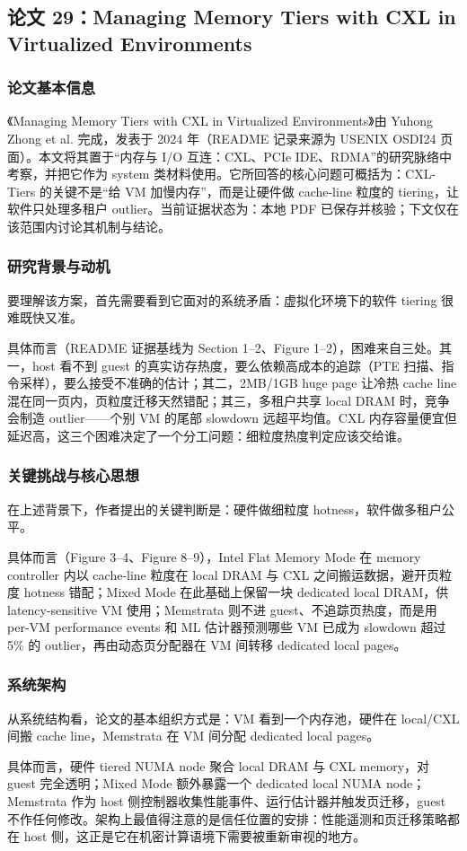 \documentclass[11pt]{ctexart}
\begin{document}
\subsection{论文 29：Managing Memory Tiers with CXL in Virtualized Environments}
\subsubsection{论文基本信息}
《Managing Memory Tiers with CXL in Virtualized Environments》由 Yuhong Zhong et al. 完成，发表于 2024 年（README 记录来源为 USENIX OSDI24 页面）。本文将其置于“内存与 I/O 互连：CXL、PCIe IDE、RDMA”的研究脉络中考察，并把它作为 system 类材料使用。它所回答的核心问题可概括为：CXL-Tiers 的关键不是“给 VM 加慢内存”，而是让硬件做 cache-line 粒度的 tiering，让软件只处理多租户 outlier。当前证据状态为：本地 PDF 已保存并核验；下文仅在该范围内讨论其机制与结论。\cite{zhong2024cxltiers}\par
\subsubsection{研究背景与动机}
要理解该方案，首先需要看到它面对的系统矛盾：虚拟化环境下的软件 tiering 很难既快又准。\par
具体而言（README 证据基线为 Section 1--2、Figure 1--2），困难来自三处。其一，host 看不到 guest 的真实访存热度，要么依赖高成本的追踪（PTE 扫描、指令采样），要么接受不准确的估计；其二，2MB/1GB huge page 让冷热 cache line 混在同一页内，页粒度迁移天然错配；其三，多租户共享 local DRAM 时，竞争会制造 outlier——个别 VM 的尾部 slowdown 远超平均值。CXL 内存容量便宜但延迟高，这三个困难决定了一个分工问题：细粒度热度判定应该交给谁。\par
\subsubsection{关键挑战与核心思想}
在上述背景下，作者提出的关键判断是：硬件做细粒度 hotness，软件做多租户公平。\par
具体而言（Figure 3--4、Figure 8--9），Intel Flat Memory Mode 在 memory controller 内以 cache-line 粒度在 local DRAM 与 CXL 之间搬运数据，避开页粒度 hotness 错配；Mixed Mode 在此基础上保留一块 dedicated local DRAM，供 latency-sensitive VM 使用；Memstrata 则不进 guest、不追踪页热度，而是用 per-VM performance events 和 ML 估计器预测哪些 VM 已成为 slowdown 超过 5\% 的 outlier，再由动态页分配器在 VM 间转移 dedicated local pages。\par
\subsubsection{系统架构}
从系统结构看，论文的基本组织方式是：VM 看到一个内存池，硬件在 local/CXL 间搬 cache line，Memstrata 在 VM 间分配 dedicated local pages。\par
具体而言，硬件 tiered NUMA node 聚合 local DRAM 与 CXL memory，对 guest 完全透明；Mixed Mode 额外暴露一个 dedicated local NUMA node；Memstrata 作为 host 侧控制器收集性能事件、运行估计器并触发页迁移，guest 不作任何修改。架构上最值得注意的是信任位置的安排：性能遥测和页迁移策略都在 host 侧，这正是它在机密计算语境下需要被重新审视的地方。\par
\end{document}
